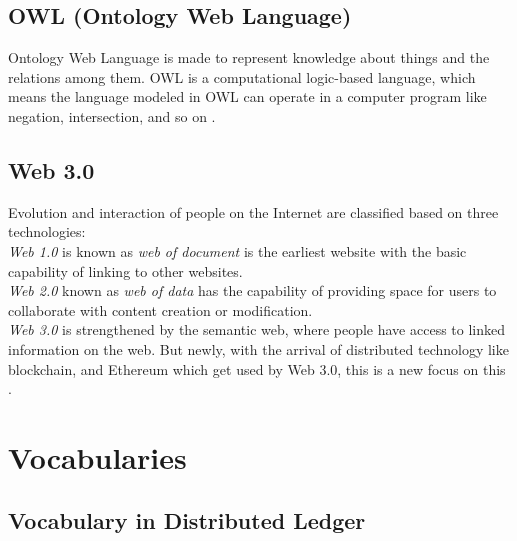 \subsection{OWL (Ontology Web Language) }
Ontology Web Language is made to represent knowledge about things and the relations among them. OWL is a computational logic-based language, which means the language modeled in OWL can operate in a computer program like negation, intersection, and so on \cite{Hector}.
\subsection{Web 3.0}
Evolution and interaction of people on the Internet are classified based on three technologies:\\
\textit{Web 1.0} is known as \textit{web of document} is the earliest website with the basic capability of linking to other websites.\\
\textit{Web 2.0} known as \textit{web of data} has the capability of providing space for users to collaborate with content creation or modification.\\
\textit{Web 3.0} is strengthened by the semantic web, where people have access to linked information on the web. But newly, with the arrival of distributed technology like blockchain, and Ethereum which get used by Web 3.0, this is a new focus on this \cite{Chhetri}.
\section{Vocabularies}
\subsection{Vocabulary in Distributed Ledger}

